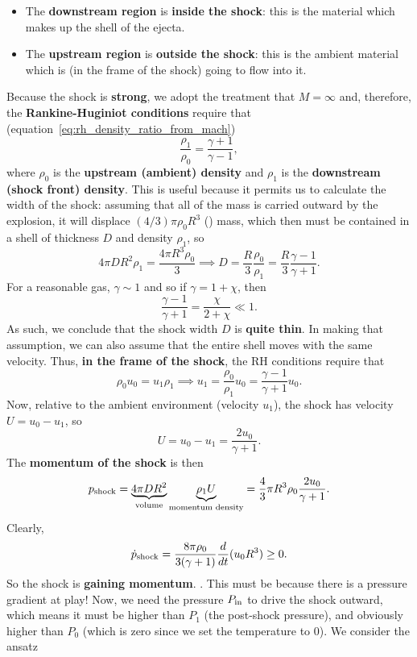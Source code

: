 \begin{itemize}
    \item The \textbf{downstream region} is \textbf{inside the shock}: this is the material which makes up the shell of the ejecta.
    \item The \textbf{upstream region} is \textbf{outside the shock}: this is the ambient material which is (in the frame of the shock) going to flow into it.
\end{itemize}
\vspace{0.25cm}
Because the shock is \textbf{strong}, we adopt the treatment that $M = \infty$ and, therefore, the \textbf{Rankine-Huginiot conditions} require that (equation~\eqref{eq:rh_density_ratio_from_mach})
\[
\frac{\rho_1}{\rho_0} = \frac{\gamma +1 }{\gamma -1},
\]
where $\rho_0$ is the \textbf{upstream (ambient) density} and $\rho_1$ is the \textbf{downstream (shock front) density}. This is useful because it permits us to calculate the width of the shock: assuming that all of the mass is carried outward by the explosion, it will displace $(4/3)\pi \rho_0 R^3$  () mass, which then must be contained in a shell of thickness $D$ and density $\rho_1$, so
\[
4\pi D R^2 \rho_1 = \frac{4\pi R^3 \rho_0}{3} \implies D = \frac{R}{3}\frac{\rho_0}{\rho_1} = \frac{R}{3} \frac{\gamma - 1}{\gamma + 1}.
\]
For a reasonable gas, $\gamma \sim 1$ and so if $\gamma = 1 + \chi$, then
\[
\frac{\gamma - 1}{\gamma +1} = \frac{\chi}{2+\chi} \ll 1.
\]
As such, we conclude that the shock width $D$ is \textbf{quite thin}. In making that assumption, we can also assume that the entire shell moves with the same velocity. Thus, \textbf{in the frame of the shock}, the RH conditions require that
\[
\rho_0u_0 = u_1\rho_1 \implies u_1 = \frac{\rho_0}{\rho_1}u_0 = \frac{\gamma - 1}{\gamma + 1} u_0.
\]
Now, relative to the ambient environment (velocity $u_1$), the shock has velocity $U = u_0-u_1$, so
\[
U = u_0-u_1  = \frac{2u_0}{\gamma + 1}.
\]
The \textbf{momentum of the shock} is then
\[
p_{\rm shock} =\underbrace{ 4\pi D R^2}_{{\rm volume}} \underbrace{\rho_1 U}_{\text{momentum density}} = \frac{4}{3}\pi R^3 \rho_0 \frac{2u_0}{\gamma + 1}.
\]
Clearly,
\[
\dot{p}_{\rm shock} = \frac{8\pi \rho_0}{3(\gamma + 1)} \frac{d}{dt}(u_0R^3) \ge 0. 
\]
So the shock is \textbf{gaining momentum}.  . This must be because there is a pressure gradient at play! Now, we need the pressure $P_{\rm in}$ to drive the shock outward, which means it must be higher than $P_1$ (the post-shock pressure), and obviously higher than $P_0$ (which is zero since we set the temperature to 0). We consider the ansatz
